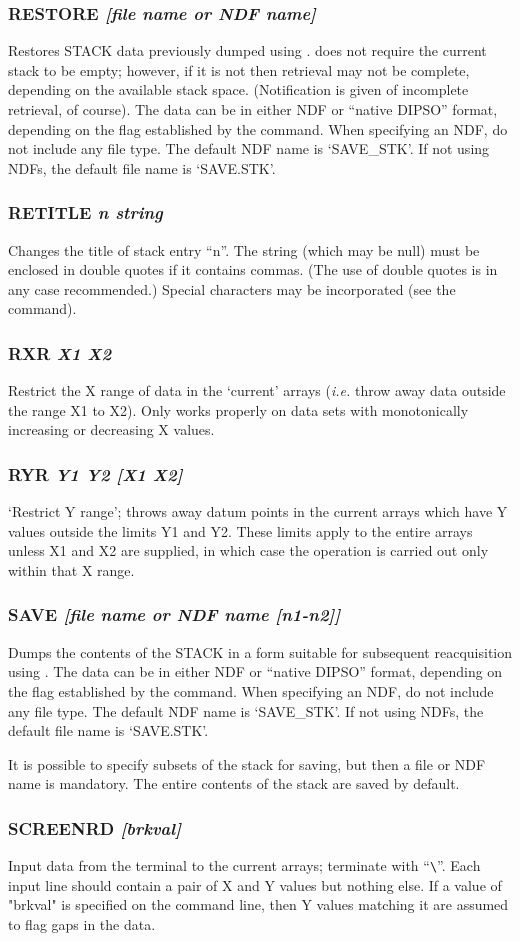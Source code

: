 \documentclass[twoside,11pt,noabs,nolof]{starlink}
\providecommand{\dipcom}[3]{\subsubsection*{\label{COM:#1}\textbf{#1} \emph{#2}}}
\begin{document}
\dipcom{RESTORE}{[file name or NDF name]}{Restores stack data previously saved to disk using {\texttt{SAVE}}}
Restores STACK data previously dumped using .    does not
require the current stack to be empty; however, if it is not then
retrieval may not be complete, depending on the available stack space.
(Notification is given of incomplete retrieval, of course). The data can
be in either NDF or ``native DIPSO'' format, depending on the flag
established by the   command. When specifying an NDF, do not
include any file type. The default NDF name is `SAVE\_STK'. If not using
NDFs, the default file name is `SAVE.STK'.


\dipcom{RETITLE}{n string}{Changes the title of a stack entry}
Changes the title of stack entry ``n''. The string (which may be null)
must be enclosed in double quotes if it contains commas. (The use of
double quotes is in any case recommended.) Special characters may be
incorporated (see the   command).

\dipcom{RXR}{X1 X2}{Throws away data outside a given X range }
Restrict the X range of data in the `current' arrays (\emph{i.e.} throw
away data outside the range X1 to X2). Only works properly on data sets
with monotonically increasing or decreasing X values.

\dipcom{RYR}{Y1 Y2 [X1 X2]}{Throws away data outside a given Y range }
`Restrict Y range'; throws away datum points in the current arrays
which have Y values outside the limits Y1 and Y2. These limits apply
to the entire arrays unless X1 and X2 are supplied, in which case the
operation is carried out only within that X range.

\dipcom{SAVE}{[file name or NDF name [n1-n2]]}{Saves stack data in a binary disk file}
Dumps the contents of the STACK in a form suitable for subsequent
reacquisition using .  The data can be in either NDF or ``native
DIPSO'' format, depending on the flag established by the 
command. When specifying an NDF, do not include any file type. The
default NDF name is `SAVE\_STK'. If not using NDFs, the default file name
is `SAVE.STK'.

It is possible to specify subsets of the stack for saving, but then a file or
NDF name is mandatory. The entire contents of the stack are saved by default.

\dipcom{SCREENRD}{[brkval]}{Reads data typed at the terminal into the current arrays}
Input data from the terminal to the current arrays; terminate with
``\verb+\+''. Each input line should contain a pair of X and Y
values but nothing else. If a value of "brkval" is specified on the
command line, then Y values matching it are assumed to flag gaps in
the data.
\end{document}
